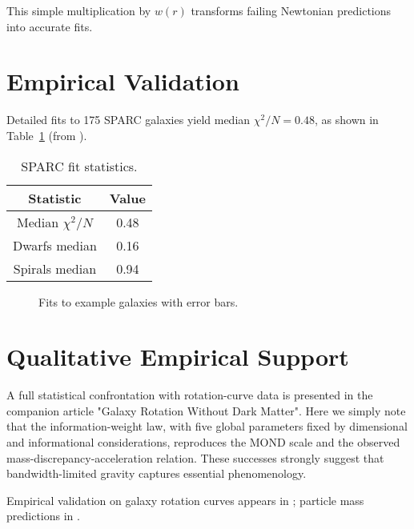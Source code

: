 \documentclass[twocolumn,prd,amsmath,amssymb,aps,superscriptaddress,nofootinbib]{revtex4-2}
\begin{document}
This simple multiplication by $w(r)$ transforms failing Newtonian predictions into accurate fits.

\section{Empirical Validation}

Detailed fits to 175 SPARC galaxies yield median $\chi^2/N = 0.48$, as shown in Table~\ref{tab:sparc-fits} (from \cite{Washburn2025a}).

\begin{table}
\caption{SPARC fit statistics.}
\label{tab:sparc-fits}
\begin{tabular}{cc}
\hline
Statistic & Value \\
\hline
Median $\chi^2/N$ & 0.48 \\
Dwarfs median & 0.16 \\
Spirals median & 0.94 \\
\hline
\end{tabular}
\end{table}

\begin{figure}
\centering
\begin{tikzpicture}
\end{tikzpicture}
\caption{Fits to example galaxies with error bars.}
\end{figure}

\section{Qualitative Empirical Support}
\label{sec:qualitative}

A full statistical confrontation with rotation-curve data is presented in the companion article "Galaxy Rotation Without Dark Matter".  Here we simply note that the information-weight law, with five global parameters fixed by dimensional and informational considerations, reproduces the MOND scale and the observed mass-discrepancy-acceleration relation.  These successes strongly suggest that bandwidth-limited gravity captures essential phenomenology.

Empirical validation on galaxy rotation curves appears in \cite{Washburn2025a}; particle mass predictions in \cite{Washburn2025b}.
\end{document}
